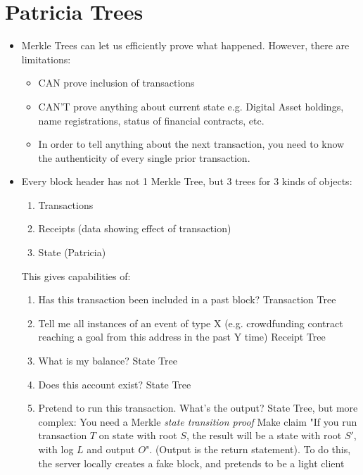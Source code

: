 \documentclass{article}
\begin{document}
\section*{Patricia Trees}
\begin{itemize}
  \item Merkle Trees can let us efficiently prove what happened. However, there are limitations:
    \begin{itemize}
      \item CAN prove inclusion of transactions
      \item CAN'T prove anything about current state
        \subitem e.g. Digital Asset holdings, name registrations, status of financial contracts, etc.
      \item In order to tell anything about the next transaction, you need to know the authenticity
        of every single prior transaction.
    \end{itemize}
  \item Every block header has not 1 Merkle Tree, but 3 trees for 3 kinds of objects:
    \begin{enumerate}
      \item Transactions
      \item Receipts (data showing effect of transaction)
      \item State (Patricia)
    \end{enumerate}
    \subitem This gives capabilities of:
    \begin{enumerate}
      \item Has this transaction been included in a past block?
        \subitem Transaction Tree
      \item Tell me all instances of an event of type X (e.g. crowdfunding contract reaching a goal from this address
        in the past Y time) 
        \subitem Receipt Tree
      \item What is my balance?
        \subitem State Tree
      \item Does this account exist?
        \subitem State Tree
      \item Pretend to run this transaction. What's the output?
        \subitem State Tree, but more complex: 
        \subitem You need a Merkle \emph{state transition proof}
        \subitem Make claim "If you run transaction $T$ on state with root $S$, the result
        will be a state with root $S'$, with log $L$ and output $O$". (Output is the return statement).
        \subitem To do this, the server locally creates a fake block, and pretends to be a light client

\end{enumerate}
\end{itemize}
\end{document}
